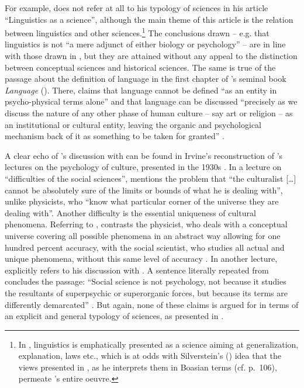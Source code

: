 \documentclass[output=paper]{langscibook}
\begin{document}
For example, {\Sapir} does not refer at all to his typology of sciences in his \citeyear{Sapir1929} article ``Linguistics as a science'', although the main theme of this article is the relation between linguistics and other sciences.\footnote{In \citet{Sapir1929}, linguistics is emphatically presented as a science aiming at generalization, explanation, laws etc., which is at odds with Silverstein’s (\citeyear{Silverstein1986}) idea that the views presented in \citet{Sapir1917}, as he interprets them in Boasian terms (cf. p.~106), permeate {\Sapir}'s entire oeuvre.}  The conclusions drawn -- e.g. that linguistics is not ``a mere adjunct of either biology or psychology'' \citep[214]{Sapir1929} -- are in line with those drawn in \citeyear{Sapir1917}, but they are attained without any appeal to the distinction between conceptual sciences and historical sciences. The same is true of the passage about the definition of language in the first chapter of {\Sapir}'s seminal book \emph{Language} (\citeyear{Sapir1921}). There, {\Sapir} claims that language cannot be defined ``as an entity in psycho-physical terms alone'' and that language can be discussed ``precisely as we discuss the nature of any other phase of human culture -- say art or religion -- as an institutional or cultural entity, leaving the organic and psychological mechanism back of it as something to be taken for granted'' \citep[10--11]{Sapir1921}.\label{q:elffers:huminst}

A clear echo of {\Sapir}'s discussion with {\Kroeber} can be found in Irvine's reconstruction of {\Sapir}'s lectures on the psychology of culture, presented in the 1930s \citep{Sapir2002}. In a lecture on ``difficulties of the social sciences'', {\Sapir} mentions the problem that ``the culturalist […] cannot be absolutely sure of the limits or bounds of what he is dealing with'', unlike physicists, who ``know what particular corner of the universe they are dealing with''. Another difficulty is the essential uniqueness of cultural phenomena. Referring to {\Rickert}, {\Sapir} contrasts the physicist, who deals with a conceptual universe covering all possible phenomena in an abstract way allowing for one hundred percent accuracy, with the social scientist, who studies all actual and unique phenomena, without this same level of accuracy \citep[56--57]{Sapir2002}. In another lecture, {\Sapir} explicitly refers to his discussion with {\Kroeber}. A sentence literally repeated from \citet[444]{Sapir1917} concludes the passage: ``Social science is not psychology, not because it studies the resultants of superpsychic or superorganic forces, but because its terms are differently demarcated'' \citep[245]{Sapir2002}. But again, none of these claims is argued for in terms of an explicit and general typology of sciences, as presented in \citet{Sapir1917}.
\end{document}
